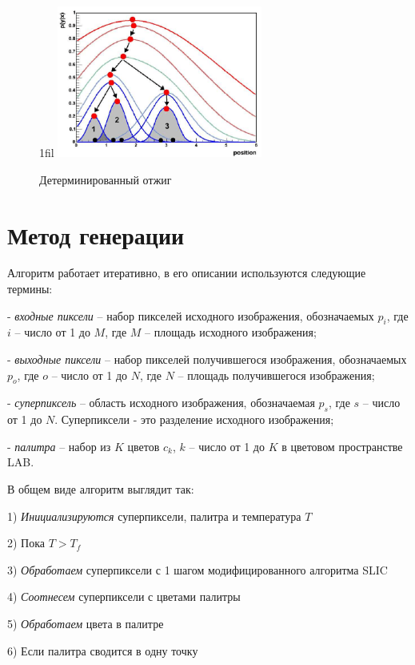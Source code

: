 \documentclass[a4paper,12pt]{report}
\makeatletter
\newcommand*{\centerfloat}{%
  \parindent \z@
  \leftskip \z@ \@plus 1fil \@minus \textwidth
  \rightskip\leftskip
  \parfillskip \z@skip}
\makeatother
\begin{document}
\begin{figure}
    \centerfloat
    \includegraphics[width=0.6\textwidth]{pixel/da.png}
    \caption{Детерминированный отжиг \citep{da}}
    \label{fig:da}
\end{figure}

\section{Метод генерации}

Алгоритм работает итеративно, в его описании используются следующие термины:

- \textit{входные пиксели} – набор пикселей исходного изображения, обозначаемых $p_i$, где $i$ – число от 1 до $M$, где $M$ – площадь исходного изображения; 

- \textit{выходные пиксели} – набор пикселей получившегося изображения, обозначаемых $p_o$, где $o$ – число от 1 до $N$, где $N$ – площадь получившегося изображения; 

- \textit{суперпиксель} – область исходного изображения, обозначаемая $p_s$, где $s$ – число от 1 до $N$. Суперпиксели - это разделение исходного изображения;

- \textit{палитра} – набор из $K$ цветов $c_k$, $k$ – число от 1 до $K$ в цветовом пространстве LAB.

В общем виде алгоритм выглядит так:

1)  \textit{Инициализируются} суперпиксели, палитра и температура $T$

2)  Пока $T > T_f$

3)      \textit{Обработаем} суперпиксели с 1 шагом модифицированного алгоритма SLIC

4)      \textit{Соотнесем} суперпиксели с цветами палитры

5)      \textit{Обработаем} цвета в палитре

6)      Если палитра сводится в одну точку
\end{document}
